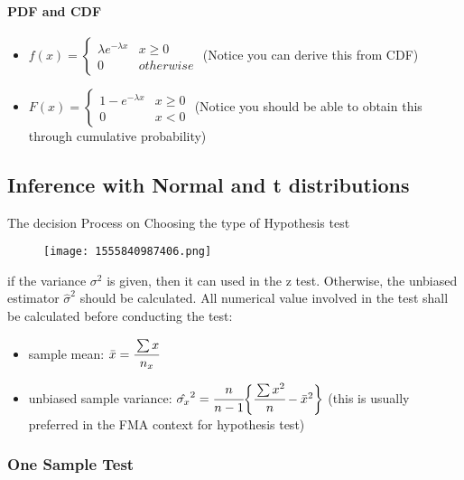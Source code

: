 \documentclass[]{article}
\let\oldparagraph\paragraph
\renewcommand{\paragraph}[1]{\oldparagraph{#1}\mbox{}}
\begin{document}
\paragraph{PDF and CDF}\label{header-n421}

\begin{itemize}
\item
  \(f(x) = \begin{cases}\lambda e^{-\lambda x} & x \ge 0 \\ 0 & otherwise \end{cases}\)
  (Notice you can derive this from CDF)
\item
  \(F(x) = \begin{cases}1-e^{-\lambda x}&x\ge 0  \\ 0 & x<0 \end{cases}\)
  (Notice you should be able to obtain this through cumulative
  probability)
\end{itemize}

\subsection{Inference with Normal and t
distributions}\label{header-n115}

The decision Process on Choosing the type of Hypothesis test

\begin{figure}
\centering
\texttt{[image: 1555840987406.png]}
\caption{}\label{mermaid}
\end{figure}

if the variance \(\sigma^2\) is given, then it can used in the z test.
Otherwise, the unbiased estimator \(\hat{\sigma}^2\) should be
calculated. All numerical value involved in the test shall be calculated
before conducting the test:

\begin{itemize}
\item
  sample mean: \(\bar{x} = \cfrac{\sum x}{n_x}\)
\item
  unbiased sample variance:
  \(\hat{\sigma_x}^2 = \cfrac{n}{n-1}\bigg\{\cfrac{\sum x^2}{n} - \bar{x}^2\bigg\}\)
  (this is usually preferred in the FMA context for hypothesis test)
\end{itemize}

\subsubsection{One Sample Test}\label{header-n124}
\end{document}
